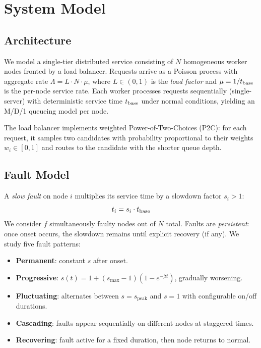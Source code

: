 \section{System Model}
\label{sec:model}

\subsection{Architecture}

We model a single-tier distributed service consisting of $N$
homogeneous worker nodes fronted by a load balancer. Requests arrive as
a Poisson process with aggregate rate $\Lambda = L \cdot N \cdot \mu$,
where $L \in (0, 1)$ is the \emph{load factor} and $\mu = 1/t_{\text{base}}$ is
the per-node service rate. Each worker processes requests sequentially
(single-server) with deterministic service time $t_{\text{base}}$ under normal
conditions, yielding an M/D/1 queueing model per node.

The load balancer implements weighted Power-of-Two-Choices (P2C): for
each request, it samples two candidates with probability proportional
to their weights $w_i \in [0, 1]$ and routes to the candidate with the
shorter queue depth.

\subsection{Fault Model}

A \emph{slow fault} on node $i$ multiplies its service time by a
slowdown factor $s_i > 1$:
\begin{equation}
  t_i = s_i \cdot t_{\text{base}}
\end{equation}
We consider $f$ simultaneously faulty nodes out of $N$ total. Faults
are \emph{persistent}: once onset occurs, the slowdown remains until
explicit recovery (if any). We study five fault patterns:

\begin{itemize}
\item \textbf{Permanent}: constant $s$ after onset.
\item \textbf{Progressive}: $s(t) = 1 + (s_{\max}-1)(1-e^{-\beta t})$,
  gradually worsening.
\item \textbf{Fluctuating}: alternates between $s = s_{\text{peak}}$ and
  $s = 1$ with configurable on/off durations.
\item \textbf{Cascading}: faults appear sequentially on different nodes
  at staggered times.
\item \textbf{Recovering}: fault active for a fixed duration, then node
  returns to normal.
\end{itemize}

